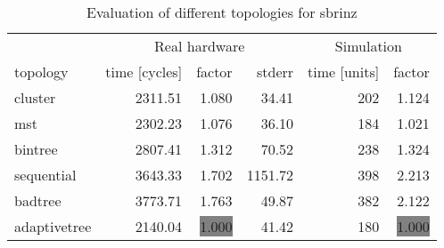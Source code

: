 \begin{table}[htb]
  \centering
  \begin{tabular}{lrrrrr}
  \toprule
  & \multicolumn{3}{c}{Real hardware} & \multicolumn{2}{c}{Simulation} \\
  topology & time [cycles] & factor & stderr & time [units] & factor \\
  \midrule
  cluster & 2311.51 & 1.080 & 34.41 & 202 & 1.124 \\
  mst & 2302.23 & 1.076 & 36.10 & 184 & 1.021 \\
  bintree & 2807.41 & 1.312 & 70.52 & 238 & 1.324 \\
  sequential & 3643.33 & 1.702 & 1151.72 & 398 & 2.213 \\
  badtree & 3773.71 & 1.763 & 49.87 & 382 & 2.122 \\
  adaptivetree & 2140.04 & \colorbox{gray}{1.000} & 41.42 & 180 & \colorbox{gray}{1.000} \\
  \midrule
  \end{tabular}
  \caption{Evaluation of different topologies for sbrinz}
  \label{tab:sbrinz}
\end{table}
